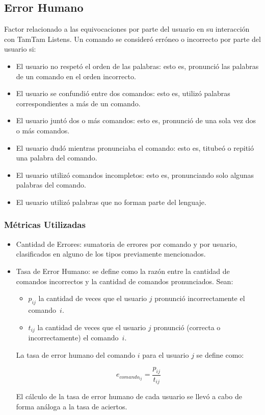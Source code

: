 \subsection{Error Humano}
Factor relacionado a las equivocaciones por parte del usuario en su interacción con
TamTam Listens.
Un comando se consideró erróneo o incorrecto por parte del usuario si:
\begin{itemize}
	\item El usuario no respetó el orden de las palabras: esto es, pronunció las palabras de un comando en el orden incorrecto.
	\item El usuario se confundió entre dos comandos: esto es, utilizó palabras correspondientes a más de un comando.
	\item El usuario juntó dos o más comandos: esto es, pronunció de una sola vez dos o más comandos.
	\item El usuario dudó mientras pronunciaba el comando: esto es, titubeó o repitió una palabra del comando.
	\item El usuario utilizó comandos incompletos: esto es, pronunciando solo algunas palabras del comando.
	\item El usuario utilizó palabras que no forman parte del lenguaje.
\end{itemize}
\subsubsection{Métricas Utilizadas}
\begin{itemize}
	\item Cantidad de Errores: sumatoria de errores por comando y por usuario, clasificados en
	alguno de los tipos previamente mencionados.
	\item Tasa de Error Humano: se define como la razón entre la cantidad de comandos incorrectos
	y la cantidad de comandos pronunciados.
	Sean:

	\begin{itemize}
		\item $p_{ij}$ la cantidad de veces que el usuario $j$ pronunció incorrectamente el \mbox{comando $i$.}
		\item $t_{ij}$ la cantidad de veces que el usuario $j$ pronunció (correcta o incorrectamente) el 
		\mbox{comando $i$.}
	\end{itemize}
	La tasa de error humano del comando $i$ para el usuario $j$ se define como: 

	\begin{equation*}
		e_{{comando}_{ij}}=\frac{p_{ij}}{t_{ij}}
	\end{equation*}

	El cálculo de la tasa de error humano de cada usuario se llevó a cabo de forma análoga 
	a la tasa de aciertos.
\end{itemize}

